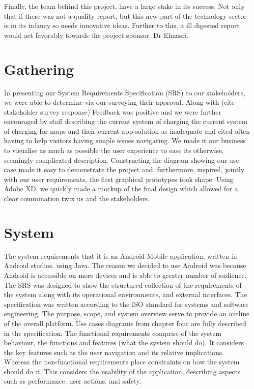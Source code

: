 Finally, the team behind this project, have a large stake in its success. Not only that if there was not a quality report, but this new part of the technology sector is in its infancy so needs innovative ideas. Further to this, a ill digested report would act favorably towards the project sponsor, Dr Elmasri.

\section{Gathering}
In presenting our System Requirements Specification (SRS) to our stakeholders, we were able to determine via our surveying their approval. Along with (cite stakeholder survey response) Feedback was positive and we were further encouraged by staff describing the current system of charging the current system of charging for maps and their current app solution as inadequate and cited often having to help visitors having simple issues navigating. We made it our business to visualise as much as possible the user experience to ease its otherwise, seemingly complicated description. Constructing the diagram showing our use case made it easy to demonstrate the project and, furthermore, inspired, jointly with our user requirements, the first graphical prototypes took shape. Using Adobe XD, we quickly made a mockup of the final design which allowed for a clear commination twix us and the stakeholders. 

\section{System}
The system requirements that it is an Android Mobile application, written in Android studios. using Java. The reason we decided to use Android was because Android is accessible on more devices and is able to greater number of audience. The SRS was designed to show the structured collection of the requirements of the system along with its operational environments, and external interfaces. The specification was written according to the ISO standard for systems and software engineering.
The purpose, scope, and system overview serve to provide an outline of the overall platform. Use cases diagrams from chapter four are fully described in the specification.
The functional requirements comprise of the system behaviour, the functions and features (what the system should do). It considers the key features such as the user navigation and its relative implications.
Whereas the non-functional requirements place constraints on how the system should do it. This considers the usability of the application, describing aspects such as performance, user actions, and safety.

